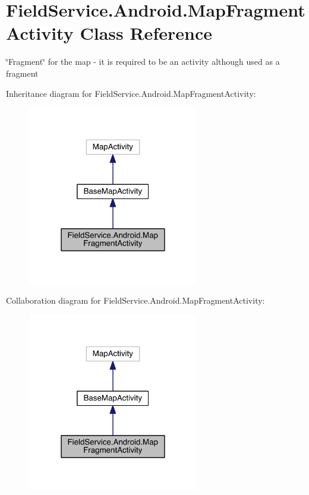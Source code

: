 \hypertarget{class_field_service_1_1_android_1_1_map_fragment_activity}{\section{Field\+Service.\+Android.\+Map\+Fragment\+Activity Class Reference}
\label{class_field_service_1_1_android_1_1_map_fragment_activity}
}


\char`\"{}\+Fragment\char`\"{} for the map -\/ it is required to be an activity although used as a fragment  




Inheritance diagram for Field\+Service.\+Android.\+Map\+Fragment\+Activity\+:
\nopagebreak
\begin{figure}[H]
\begin{center}
\leavevmode
\includegraphics[width=210pt]{class_field_service_1_1_android_1_1_map_fragment_activity__inherit__graph}
\end{center}
\end{figure}


Collaboration diagram for Field\+Service.\+Android.\+Map\+Fragment\+Activity\+:
\nopagebreak
\begin{figure}[H]
\begin{center}
\leavevmode
\includegraphics[width=210pt]{class_field_service_1_1_android_1_1_map_fragment_activity__coll__graph}
\end{center}
\end{figure}
